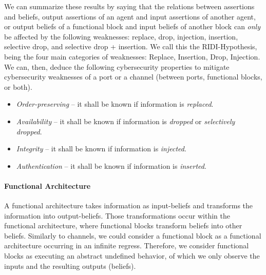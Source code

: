\documentclass[conference]{IEEEtran}
\begin{document}
We can summarize these results by saying that the relations between assertions
and beliefs, output assertions of an agent and input assertions of another
agent, or output beliefs of a functional block and input beliefs of another
block can \emph{only} be affected by the following weaknesses: replace, drop,
injection, insertion, selective drop, and selective drop + insertion. 
We call this the RIDI-Hypothesis, being the
four main categories of weaknesses: Replace, Insertion, Drop, Injection. We can,
then, deduce the following cybersecurity properties to mitigate cybersecurity weaknesses
of a port or a channel (between ports, functional blocks, or both).
\begin{itemize}
	\item \emph{Order-preserving} -- it shall be known if information is \emph{replaced}.
	\item \emph{Availability} -- it shall be known if information is \emph{dropped} or \emph{selectively dropped}.
	\item \emph{Integrity} -- it shall be known if information is \emph{injected}.
	\item \emph{Authentication} -- it shall be known if information is \emph{inserted}.
\end{itemize}



\paragraph{Functional Architecture}
A functional architecture takes information as input-beliefs and transforms the
information into output-beliefs. Those transformations occur within the
functional architecture, where functional blocks transform beliefs into other
beliefs. Similarly to channels, we could consider a functional block as a
functional architecture occurring in an infinite regress. Therefore, we
consider functional blocks as executing an abstract undefined behavior, of
which we only observe the inputs and the resulting outputs (beliefs).
\end{document}
